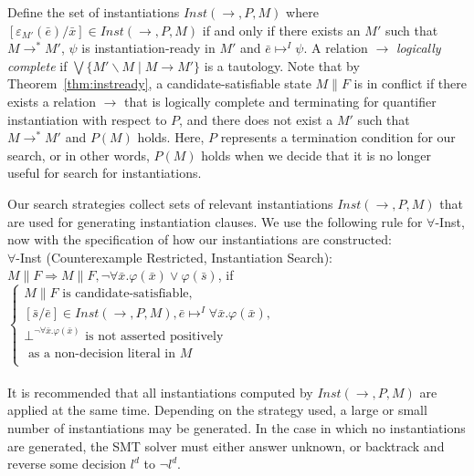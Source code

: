 \documentclass{llncs}
\begin{document}
Define the set of instantiations $Inst( \rightarrow, P, M )$ where $[\varepsilon_{M'}(\bar{e})/\bar{x}] \in Inst( \rightarrow, P, M )$ if and only if there exists an $M'$ such that $M \rightarrow^\ast M'$, $\psi$ is instantiation-ready in $M'$ and $\bar{e} \mapsto^I \psi$.
A relation $\rightarrow$ \emph{logically complete} if $\bigvee \{ M' \backslash M \mid M \rightarrow M' \}$ is a tautology.
Note that by Theorem~\ref{thm:instready}, a candidate-satisfiable state $M \parallel F$ is in conflict if there exists a relation $\rightarrow$ that is logically complete and terminating for quantifier instantiation with respect to $P$, and there does not exist a $M'$ such that $M \rightarrow^\ast M'$ and $P(M)$ holds.
Here, $P$ represents a termination condition for our search, or in other words, $P(M)$ holds when we decide that it is no longer useful for search for instantiations.

Our search strategies collect sets of relevant instantiations $Inst( \rightarrow, P, M )$ that are used for generating instantiation clauses.
We use the following rule for $\forall$-Inst, now with the specification of how our instantiations are constructed: \\

\noindent $\forall$-Inst (Counterexample Restricted, Instantiation Search): \\

$M \parallel F \Longrightarrow M \parallel F, \neg \forall \bar{x}. \varphi( \bar{ x } ) \vee \varphi( \bar{ s } )$, if   
$\begin{cases}
  M \parallel F \text{ is candidate-satisfiable}, \\
  [\bar{ s }/\bar{e}] \in Inst( \rightarrow, P, M ), \bar{e} \mapsto^I \forall \bar{x}. \varphi( \bar{ x } ), \\
  \bot^{\neg \forall \bar{x}. \varphi( \bar{ x } )} \text{ is not asserted positively }\\
  \text{ \ \ \ as a non-decision literal in $M$ } \\    
\end{cases}$ \\

\ \\

It is recommended that all instantiations computed by $Inst( \rightarrow, P, M )$ are applied at the same time.
Depending on the strategy used, a large or small number of instantiations may be generated.
In the case in which no instantiations are generated, the SMT solver must either answer unknown, or backtrack and reverse some decision $l^d$ to $\neg l^d$.
\end{document}
